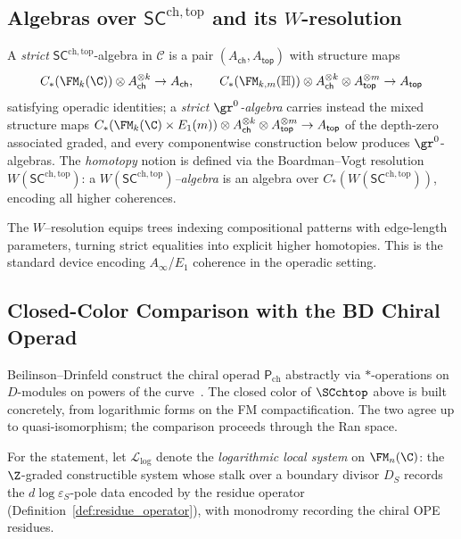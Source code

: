 \subsection{Algebras over $\mathsf{SC}^{\mathrm{ch,top}}$ and its $W$-resolution}
\label{subsec:WSC-alg}
\begin{definition}
\label{def:SC-alg}
A \emph{strict} $\mathsf{SC}^{\mathrm{ch,top}}$-algebra in $\mathcal C$ is a pair $(A_{\mathsf{ch}},A_{\mathsf{top}})$ with structure maps
\[
C_\ast(\FM_k(\C))\otimes A_{\mathsf{ch}}^{\otimes k}\to A_{\mathsf{ch}},\qquad
C_\ast(\FM_{k,m}(\mathbb H))\otimes A_{\mathsf{ch}}^{\otimes k}\otimes A_{\mathsf{top}}^{\otimes m}\to A_{\mathsf{top}}
\]
satisfying operadic identities; a \emph{strict $\gr^0$-algebra}
carries instead the mixed structure maps
$C_\ast(\FM_k(\C)\times E_1(m))\otimes A_{\mathsf{ch}}^{\otimes k}\otimes A_{\mathsf{top}}^{\otimes m}\to A_{\mathsf{top}}$
of the depth-zero associated graded, and every componentwise
construction below produces $\gr^0$-algebras. The \emph{homotopy} notion is defined via the Boardman--Vogt resolution $W(\mathsf{SC}^{\mathrm{ch,top}})$: a \emph{$W(\mathsf{SC}^{\mathrm{ch,top}})$–algebra} is an algebra over $C_\ast(W(\mathsf{SC}^{\mathrm{ch,top}}))$, encoding all higher coherences.
\end{definition}

\begin{remark}
The $W$–resolution equips trees indexing compositional patterns with edge-length parameters, turning strict equalities into explicit higher homotopies. This is the standard device encoding $A_\infty$/$E_1$ coherence in the operadic setting.
\end{remark}

\subsection{Closed-Color Comparison with the BD Chiral Operad}
\label{subsec:BD-compare}

Beilinson--Drinfeld construct the chiral operad $\mathsf P_{\mathrm{ch}}$ abstractly via $\ast$-operations on $D$-modules on powers of the curve~\cite[\S3.4]{BD04}. The closed color of $\SCchtop$ above is built concretely, from logarithmic forms on the FM compactification. The two agree up to quasi-isomorphism; the comparison proceeds through the Ran space.

For the statement, let $\mathscr L_{\log}$ denote the \emph{logarithmic local system} on $\FM_n(\C)$: the $\Z$-graded constructible system whose stalk over a boundary divisor $D_S$ records the $d\log\varepsilon_S$-pole data encoded by the residue operator (Definition~\ref{def:residue_operator}), with monodromy recording the chiral OPE residues.

